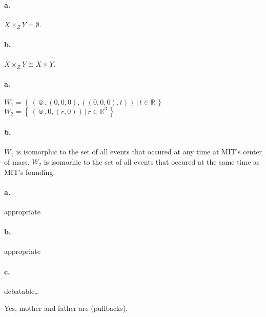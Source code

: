\paragraph{a.}
$X \times_Z Y = \emptyset$.
\paragraph{b.}
$X \times_Z Y \cong X \times Y$.


\paragraph{a.}
$W_1 = \left\{\,\left(\smiley,(0,0,0),((0,0,0),t)\right)\,\vert\,t\in\mathbb{R}\,\right\}$
$W_2 = \left\{\,\left(\smiley,0,(r,0)\right)\,\vert\,r\in\mathbb{R}^3\,\right\}$
\paragraph{b.}
$W_1$ is isomorphic to the set of all events that occured at any time
at MIT's center of mass.  $W_2$ is isomorhic to the set of all events
that occured at the same time as MIT's founding.


\paragraph{a.}
appropriate
\paragraph{b.}
appropriate
\paragraph{c.}
debatable\ldots


Yes, mother and father are (pullbacks).


